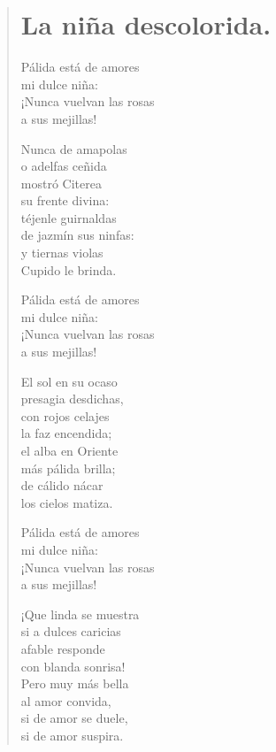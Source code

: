 \documentclass[12pt, twoside]{book}
\begin{document}
\newpage
\begin{verse}
\begin{center}
\section{La niña descolorida.}
\end{center}
Pálida está de amores\\
mi dulce niña:\\
¡Nunca vuelvan las rosas\\
a sus mejillas!
\newline

Nunca de amapolas\\
o adelfas ceñida\\
mostró Citerea\\
su frente divina:\\
téjenle guirnaldas\\
de jazmín sus ninfas:\\
y tiernas violas\\
Cupido le brinda.
\newline

Pálida está de amores\\
mi dulce niña:\\
¡Nunca vuelvan las rosas\\
a sus mejillas!
\newline

El sol en su ocaso\\
presagia desdichas,\\
con rojos celajes\\
la faz encendida;\\
el alba en Oriente\\
más pálida brilla;\\
de cálido nácar\\
los cielos matiza.
\newline

Pálida está de amores\\
mi dulce niña:\\
¡Nunca vuelvan las rosas\\
a sus mejillas!
\newline

¡Que linda se muestra\\
si a dulces caricias\\
afable responde\\
con blanda sonrisa!\\
Pero muy más bella\\
al amor convida,\\
si de amor se duele,\\
si de amor suspira.
\newline


\end{verse}
\end{document}

